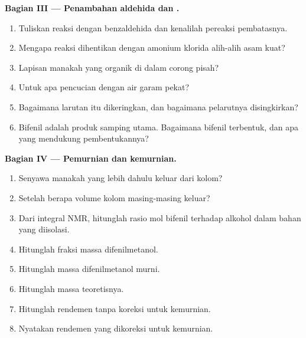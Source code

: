 \begin{problem}
\medskip
\noindent\textbf{Bagian III --- Penambahan aldehida dan .}
\begin{enumerate}[resume]
  \item Tuliskan reaksi dengan benzaldehida dan kenalilah pereaksi pembatasnya.
  \item Mengapa reaksi dihentikan dengan amonium klorida alih-alih asam kuat?
  \item Lapisan manakah yang organik di dalam corong pisah?
  \item Untuk apa pencucian dengan air garam pekat?
  \item Bagaimana larutan itu dikeringkan, dan bagaimana pelarutnya disingkirkan?
  \item Bifenil adalah produk samping utama. Bagaimana bifenil terbentuk,
        dan apa yang mendukung pembentukannya?
\end{enumerate}

\medskip
\noindent\textbf{Bagian IV --- Pemurnian dan kemurnian.}
\begin{enumerate}[resume]
  \item Senyawa manakah yang lebih dahulu keluar dari kolom?
  \item Setelah berapa volume kolom masing-masing keluar?
  \item Dari integral NMR, hitunglah rasio mol bifenil terhadap alkohol dalam
        bahan yang diisolasi.
  \item Hitunglah fraksi massa difenilmetanol.
  \item Hitunglah massa difenilmetanol murni.
  \item Hitunglah massa teoretisnya.
  \item Hitunglah rendemen tanpa koreksi untuk kemurnian.
  \item Nyatakan rendemen yang dikoreksi untuk kemurnian.
\end{enumerate}
\end{problem}
